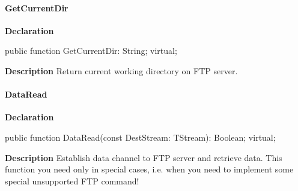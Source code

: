 \documentclass{report}
\newif\ifpdf
\begin{document}
\paragraph*{GetCurrentDir}\hspace*{\fill}

\label{ftpsend.TFTPSend-GetCurrentDir}
\begin{list}{}{
\setlength{\itemindent}{0cm}
\setlength{\listparindent}{0cm}
\setlength{\leftmargin}{\evensidemargin}
\addtolength{\leftmargin}{\tmplength}
\settowidth{\labelsep}{X}
\addtolength{\leftmargin}{\labelsep}
\setlength{\labelwidth}{\tmplength}
}
\item[\textbf{Declaration}\hfill]
\ifpdf
\begin{flushleft}
\fi
\begin{ttfamily}
public function GetCurrentDir: String; virtual;\end{ttfamily}

\ifpdf
\end{flushleft}
\fi

\par
\item[\textbf{Description}]
Return current working directory on FTP server.

\end{list}
\paragraph*{DataRead}\hspace*{\fill}

\label{ftpsend.TFTPSend-DataRead}
\begin{list}{}{
\setlength{\itemindent}{0cm}
\setlength{\listparindent}{0cm}
\setlength{\leftmargin}{\evensidemargin}
\addtolength{\leftmargin}{\tmplength}
\settowidth{\labelsep}{X}
\addtolength{\leftmargin}{\labelsep}
\setlength{\labelwidth}{\tmplength}
}
\item[\textbf{Declaration}\hfill]
\ifpdf
\begin{flushleft}
\fi
\begin{ttfamily}
public function DataRead(const DestStream: TStream): Boolean; virtual;\end{ttfamily}

\ifpdf
\end{flushleft}
\fi

\par
\item[\textbf{Description}]
Establish data channel to FTP server and retrieve data. This function you need only in special cases, i.e. when you need to implement some special unsupported FTP command!

\end{list}
\end{document}
